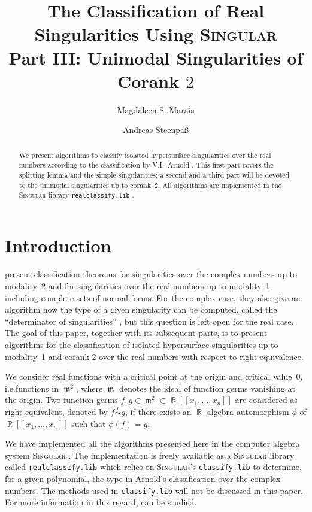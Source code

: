 \documentclass[noend]{amsproc}
\title[The Classification of Real Singularities Using \textsc{Singular}, %
Part III]%
{The Classification of Real Singularities Using \textsc{Singular}\\
Part III: Unimodal Singularities of Corank $2$}
\author{Magdaleen S. Marais}
\author{Andreas Steenpa\ss}
\theoremstyle{definition}
\newcommand{\Singular}{\textsc{Singular}}
\newcommand{\realclassify}{\texttt{realclassify.lib}}
\newcommand{\classify}{\texttt{classify.lib}}
\newcommand{\requiv}{\ensuremath{\mathrel{\overset{r}{\sim}}}}
\DeclareMathOperator{\m}{\mathfrak{m}}
\DeclareMathOperator{\R}{\mathbb{R}}
\begin{document}
\begin{abstract}
We present algorithms to classify isolated hypersurface singularities over the
real numbers according to the classification by V.I.~Arnold \citep{AVG1985}.
This first part covers the splitting lemma and the simple singularities; a
second and a third part will be devoted to the unimodal singularities up to
corank~2. All algorithms are implemented in the \Singular{} library
\realclassify{} \citep{realclassify}.
\end{abstract}

\maketitle


\section{Introduction}
\citet{AVG1985} present classification theorems for singularities over the
complex numbers up to modality~2 and for singularities over the real numbers up
to modality~1, including complete sets of normal forms. For the complex case,
they also give an algorithm how the type of a given singularity can be
computed, called the ``determinator of singularities''
\citep[cf.\@][ch.~16]{AVG1985}, but this question is left open for the real
case. The goal of this paper, together with its subsequent parts, is to present
algorithms for the classification of isolated hypersurface singularities up to
modality~1 and corank 2 over the real numbers with respect to right
equivalence.

We consider real functions with a critical point at the origin and critical
value~$0$, i.e.\@ functions in $\m^2$, where $\m$ denotes the ideal of function
germs vanishing at the origin. Two function germs $f, g \in \m^2 \subset
\R[[x_1,\ldots,x_n]]$ are considered as right equivalent, denoted by
$f \requiv g$, if there exists an $\R$-algebra automorphism $\phi$ of
$\R[[x_1,\ldots,x_n]]$ such that $\phi(f) = g$.

We have implemented all the algorithms presented here in the computer algebra
system \Singular{} \citep{DGPS}. The implementation is freely available as a
\Singular{} library called \realclassify{} which relies on \Singular's
\classify{} to determine, for a given polynomial, the type in Arnold's
classification over the complex numbers. The methods used in \classify{} will
not be discussed in this paper. For more information in this regard,
\citet{Kruger} can be studied.
\end{document}
